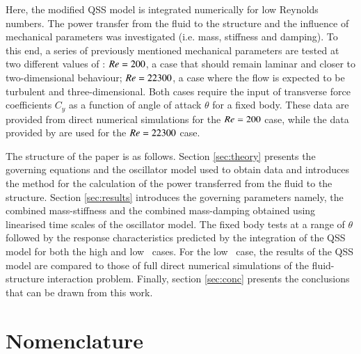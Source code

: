 Here, the modified QSS model is integrated numerically for low Reynolds numbers. The power transfer from the fluid to the structure and the influence of mechanical parameters was investigated (i.e. mass, stiffness and damping). To this end, a series of previously mentioned mechanical parameters are tested at two different values of \reynoldsnumber: $Re = 200$, a case that should remain laminar and closer to two-dimensional behaviour; $Re = 22300$, a case where the flow is expected to be turbulent and three-dimensional. Both cases require the input of transverse force coefficients $C_y$ as a function of angle of attack $\theta$ for a fixed body. These data are provided from direct numerical simulations for the $Re = 200$ case, while the data provided by \citet{Parkinson1964} are used for the $Re = 22300$ case.

The structure of the paper is as follows. Section \ref{sec:theory} presents the governing equations and the oscillator model used to obtain data and introduces the method for the calculation of the power transferred from the fluid to the structure. Section \ref{sec:results} introduces the governing parameters namely, the combined mass-stiffness and the combined mass-damping obtained using linearised time scales of the oscillator model. The fixed body tests at a range of $\theta$ followed by the response characteristics predicted by the integration of the QSS model for both the high and low \reynoldsnumber\ cases. For the low \reynoldsnumber\ case, the results of the QSS model are compared to those of full direct numerical simulations of the fluid-structure interaction problem. Finally, section \ref{sec:conc} presents the conclusions that can be drawn from this work.
\section*{Nomenclature}

